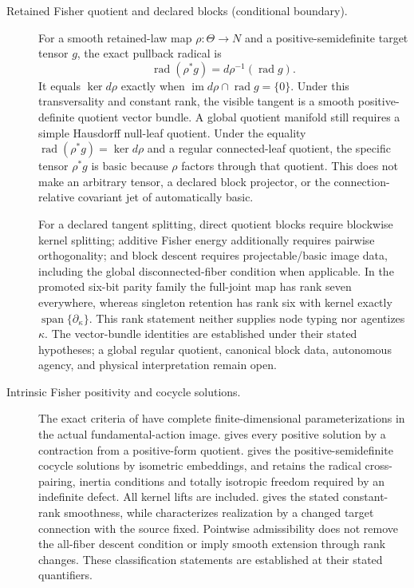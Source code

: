 \begin{description}
\item[Retained Fisher quotient and declared blocks (conditional boundary).]
For a smooth retained-law map \(\rho:\Theta\to N\) and a positive-semidefinite
target tensor \(g\), the exact pullback radical is
\[
\operatorname{rad}(\rho^*g)
 =d\rho^{-1}(\operatorname{rad}g).
\]
It equals \(\ker d\rho\) exactly when
\(\operatorname{im}d\rho\cap\operatorname{rad}g=\{0\}\).  Under this
transversality and constant rank, the visible tangent is a smooth
positive-definite quotient vector bundle.  A global quotient manifold still
requires a simple Hausdorff null-leaf quotient.  Under the equality
\(\operatorname{rad}(\rho^*g)=\ker d\rho\) and a regular connected-leaf
quotient, the specific tensor \(\rho^*g\) is basic because \(\rho\) factors
through that quotient.  This does not make an arbitrary tensor, a
declared block projector, or the connection-relative covariant jet of
 automatically basic.

For a declared tangent splitting, direct quotient blocks require blockwise
kernel splitting; additive Fisher energy additionally requires pairwise
orthogonality; and block descent requires projectable/basic image data,
including the global disconnected-fiber condition when applicable.  In the
promoted six-bit parity family the full-joint map has rank seven everywhere,
whereas singleton retention has rank six with kernel exactly
\(\operatorname{span}\{\partial_\kappa\}\).  This rank statement neither
supplies node typing nor agentizes \(\kappa\).  The vector-bundle identities
are established under their stated hypotheses; a global regular quotient,
canonical block data, autonomous agency, and physical interpretation remain
open. 

\item[Intrinsic Fisher positivity and cocycle solutions.]
The exact criteria of
have complete finite-dimensional parameterizations in the actual
fundamental-action image.  gives every
positive solution by a contraction from a positive-form quotient.
 gives the positive-semidefinite
cocycle solutions by isometric embeddings, and
 retains the radical cross-pairing, inertia
conditions and totally isotropic freedom required by an indefinite defect.
All kernel lifts are included.  gives
the stated constant-rank smoothness, while
 characterizes realization by a
changed target connection with the source fixed. Pointwise admissibility
does not remove the all-fiber descent condition or imply smooth extension
through rank changes. These classification statements are established at
their stated quantifiers. 


\end{description}

